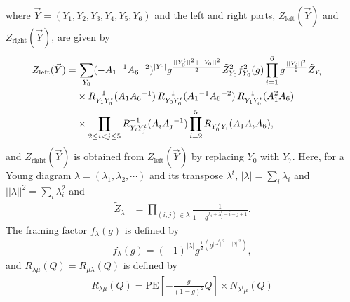 where $\vec{Y}=(Y_1, Y_2, Y_3, Y_4, Y_5, Y_6)$ and the left and right parts,
$Z_{\text{left}}(\vec{Y})$ and $Z_{\text{right}}(\vec{Y})$, are given by
\begin{align}
Z_{\text{left}}(\vec{Y})=& \,
\sum_{Y_0} ( - A_1{}^{-1} A_6{}^{-2})^{|Y_0|} 
g^{\frac{||Y_0^t||^2+||Y_0||^2}{2}} \tilde{Z}_{Y_0}^2 f_{Y_0}^2(g)
\prod_{i=1}^6 g^{\frac{||Y_i||^2}{2}} \tilde{Z}_{Y_i} 
\cr 
& 
\times 
R_{Y_1 Y_6^t}^{-1} (A_1 A_6{}^{-1})\,R_{Y_0 Y_6^t}^{-1} (A_1{}^{-1} A_6{}^{-2})\,R_{Y_1Y_0^t }^{-1} (A_1^2A_6) \cr 
& 
\times  
 \prod_{2 \le i <  j \le 5} R_{Y_i Y_j^t}^{-1} (A_i A_j{}^{-1})
 \prod_{i=2}^5 R_{Y_0^t Y_i} (A_1 A_i  A_6) ,
\end{align}
and $Z_{\text{right}}(\vec{Y})$ is obtained from $Z_{\text{left}}(\vec{Y})$ by replacing $Y_0$ with $Y_7$. %
Here, for a Young diagram $\lambda = (\lambda_1, \lambda_2, \cdots)$ and its transpose $\lambda^t$,  $|\lambda|=\sum_{i}\lambda_i$ and $||\lambda||^2 =\sum_{i}\lambda_i^2$ and 
\begin{align}
\tilde{Z}_{\lambda} 
&= \prod_{(i,j) \in \lambda} \frac{1}{1 - g^{\lambda_i + \lambda^t_j - i - j +1} }. 	
\end{align}
The framing factor $f_{\lambda}(g)$ is defined by
\begin{align}
f_\lambda(g) = (-1)^{|\lambda|}g^{\frac{1}{2}(g^{||\lambda^t||^2 - ||\lambda||^2})},
\end{align}
and $R_{\lambda \mu } (Q)=R_{\mu \lambda} (Q)$ is defined by
\begin{align}
R_{\lambda \mu } (Q)%
=\text{PE} \left[ - \frac{g}{(1-g)^2} Q \right]
\times N_{\lambda^t \mu} (Q)
\end{align}
